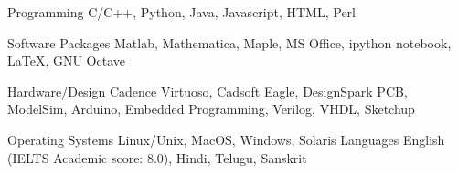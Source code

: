 % 


\begin{cvskills}

  \cvskill
    {Programming} %
    {C/C++, Python, Java, Javascript, HTML, Perl} %

  \cvskill
    {Software Packages} %
    {Matlab, Mathematica, Maple, MS Office, ipython notebook, LaTeX, GNU Octave} %

  \cvskill
    {Hardware/Design} %
    {Cadence Virtuoso, Cadsoft Eagle, DesignSpark PCB, ModelSim, Arduino, Embedded Programming, Verilog, VHDL, Sketchup} %

\cvskill
{Operating Systems} %
{Linux/Unix, MacOS, Windows, Solaris} %
  \cvskill
    {Languages} %
    {English (IELTS Academic score: 8.0), Hindi, Telugu, Sanskrit} %

    
\end{cvskills}
% 
% 

